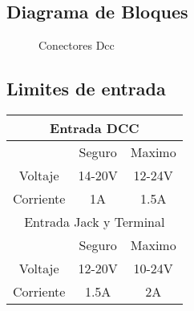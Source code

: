 

\subsection{Diagrama de Bloques}
\begin{figure}[H]
    \centering
    
    \caption{Conectores Dcc}
    \label{fig:BlockDiagrama}
\end{figure}



\subsection{Limites de entrada}
\begin{center}
    \begin{tabular}{ c c c }
        \multicolumn{3}{c}{Entrada DCC} \\ \hline
      & Seguro & Maximo \\ 
     Voltaje & 14-20V & 12-24V \\  
     Corriente & 1A & 1.5A \\
     [1ex] 
     \multicolumn{3}{c}{Entrada Jack y Terminal} \\ \hline
     & Seguro & Maximo \\ 
     Voltaje & 12-20V & 10-24V \\  
     Corriente & 1.5A & 2A \\ \hline
    
    \end{tabular}
\end{center}